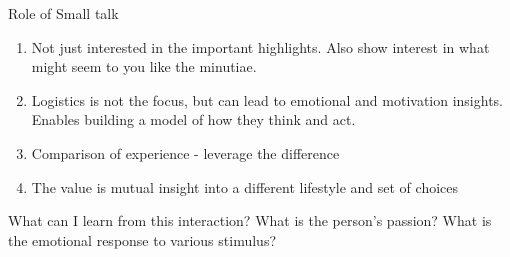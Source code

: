 Role of Small talk
\begin{enumerate}
\item Not just interested in the important highlights. Also show interest in what might seem to you like the minutiae. 
\item Logistics is not the focus, but can lead to emotional and motivation insights. Enables building a model of how they think and act.
\item Comparison of experience - leverage the difference
\item The value is mutual insight into a different lifestyle and set of choices
\end{enumerate}

What can I learn from this interaction?
What is the person's passion?
What is the emotional response to various stimulus?

